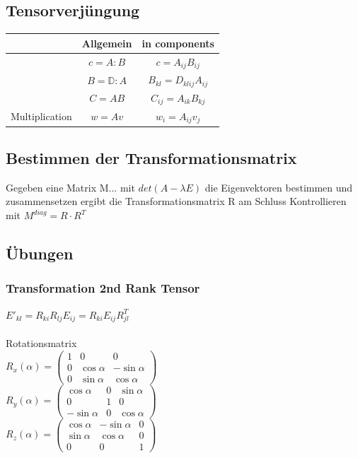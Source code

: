 \documentclass[a4paper]{scrartcl}
\begin{document}
\subsection{Tensorverjüngung}
\begin{tabular}{|c|c|c|}
\hline  & Allgemein & in components \\ 
\hline  & $c=A:B$ & $c=A_{ij}B_{ij}$ \\ 
\hline  & $B=\mathbb{D}:A$ & $B_{kl}=D_{klij}A_{ij}$ \\
\hline  & $C=AB$ & $C_{ij}=A_{ik}B_{kj}$ \\
\hline Multiplication & $w=Av$ & $w_i=A_{ij}v_{j}$ \\
\hline 
\end{tabular} 

\subsection{Bestimmen der Transformationsmatrix}

Gegeben eine Matrix M... mit $det(A-\lambda E)$ die Eigenvektoren bestimmen und zusammensetzen ergibt die Transformationsmatrix R am Schluss Kontrollieren mit $M^{diag}=R \cdot R^T$



\subsection{Übungen}
\subsubsection{Transformation 2nd Rank Tensor}
$E'_{kl}=R_{ki}R_{lj}E_{ij}=R_{ki}E_{ij}R_{jl}^T$
\\
\\
Rotationsmatrix
\\
$R_x(\alpha) = \begin{pmatrix} 
1 &   0         & 0           \\
0 & \cos \alpha & -\sin \alpha \\
0 & \sin \alpha &  \cos \alpha
\end{pmatrix} $
\\
$R_y(\alpha) = \begin{pmatrix} 
\cos \alpha  & 0 & \sin \alpha \\
   0         & 1 &  0          \\
-\sin \alpha & 0 & \cos \alpha
\end{pmatrix} $
\\
$R_z(\alpha) = \begin{pmatrix} 
\cos \alpha & -\sin \alpha & 0 \\
\sin \alpha &  \cos \alpha & 0 \\            
   0        &  0           & 1
\end{pmatrix}$
\\
\end{document}
